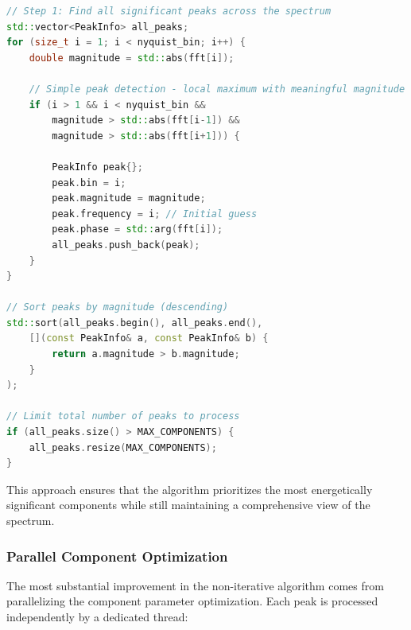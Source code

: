 \documentclass[11pt,twoside]{report}
\numberwithin{thm}{section}
\numberwithin{equation}{section}
\begin{document}
\begin{lstlisting}[language=C++, 
                   caption=Peak Identification in Non-Iterative DKD, 
                   basicstyle=\footnotesize\ttfamily,
                   breaklines=true,
                   breakatwhitespace=true]
// Step 1: Find all significant peaks across the spectrum
std::vector<PeakInfo> all_peaks;
for (size_t i = 1; i < nyquist_bin; i++) {
    double magnitude = std::abs(fft[i]);

    // Simple peak detection - local maximum with meaningful magnitude
    if (i > 1 && i < nyquist_bin &&
        magnitude > std::abs(fft[i-1]) &&
        magnitude > std::abs(fft[i+1])) {

        PeakInfo peak{};
        peak.bin = i;
        peak.magnitude = magnitude;
        peak.frequency = i; // Initial guess
        peak.phase = std::arg(fft[i]);
        all_peaks.push_back(peak);
    }
}

// Sort peaks by magnitude (descending)
std::sort(all_peaks.begin(), all_peaks.end(),
    [](const PeakInfo& a, const PeakInfo& b) {
        return a.magnitude > b.magnitude;
    }
);

// Limit total number of peaks to process
if (all_peaks.size() > MAX_COMPONENTS) {
    all_peaks.resize(MAX_COMPONENTS);
}
\end{lstlisting}

This approach ensures that the algorithm prioritizes the most energetically significant components while still maintaining a comprehensive view of the spectrum.

\subsubsection{Parallel Component Optimization}

The most substantial improvement in the non-iterative algorithm comes from parallelizing the component parameter optimization. Each peak is processed independently by a dedicated thread:
\end{document}
